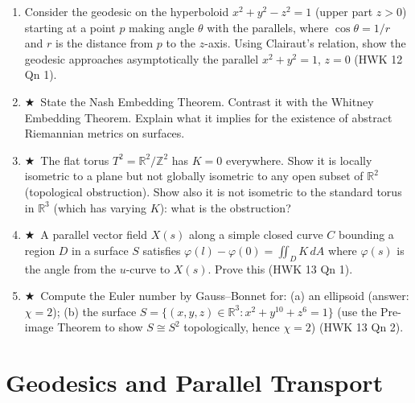 \documentclass[11pt, a4paper]{article}
\newcommand{\R}{\mathbb{R}}
\newcommand{\Z}{\mathbb{Z}}
\newcommand{\hard}{$\bigstar$\ }
\begin{document}
\begin{enumerate}[label=\textbf{Q\arabic*.}, leftmargin=*, itemsep=6pt]
\item Consider the geodesic on the hyperboloid $x^2+y^2-z^2=1$ (upper part $z>0$) starting at a point $p$ making angle $\theta$ with the parallels, where $\cos\theta=1/r$ and $r$ is the distance from $p$ to the $z$-axis. Using Clairaut's relation, show the geodesic approaches asymptotically the parallel $x^2+y^2=1$, $z=0$ (HWK 12 Qn 1).

\item \hard State the Nash Embedding Theorem. Contrast it with the Whitney Embedding Theorem. Explain what it implies for the existence of abstract Riemannian metrics on surfaces.

\item \hard The flat torus $T^2=\R^2/\Z^2$ has $K=0$ everywhere. Show it is locally isometric to a plane but not globally isometric to any open subset of $\R^2$ (topological obstruction). Show also it is not isometric to the standard torus in $\R^3$ (which has varying $K$): what is the obstruction?

\item \hard A parallel vector field $X(s)$ along a simple closed curve $C$ bounding a region $D$ in a surface $S$ satisfies $\varphi(l)-\varphi(0)=\iint_D K\,dA$ where $\varphi(s)$ is the angle from the $u$-curve to $X(s)$. Prove this (HWK 13 Qn 1).

\item \hard Compute the Euler number by Gauss--Bonnet for: (a) an ellipsoid (answer: $\chi=2$); (b) the surface $S=\{(x,y,z)\in\R^3:x^2+y^{10}+z^6=1\}$ (use the Pre-image Theorem to show $S\cong S^2$ topologically, hence $\chi=2$) (HWK 13 Qn 2).

\end{enumerate}

\section{Geodesics and Parallel Transport}
\end{document}
